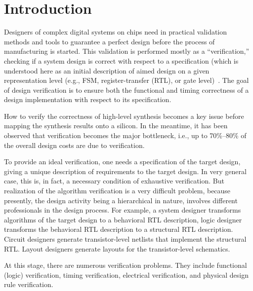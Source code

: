 
      \thispagestyle{headings}

      \begin{multicols}{2}

      \label{st\stat}



\section{Introduction}

\noindent
Designers of complex digital systems on chips need in practical validation methods and tools to guarantee a
perfect design before the process of manufacturing is started. This validation is performed mostly as a
``veri\-fi\-cation,'' checking if a system design is correct with respect to a specification (which is understood here
as an initial description of aimed design on a given representation level (e.g., FSM,
register-transfer (RTL), or gate level)~\cite{1bar}. The goal of design verification is to ensure both the functional and
timing correctness of a design implementation with respect to its specification.

    How to verify the correctness of high-level synthesis becomes a key issue before mapping the synthesis
results onto a silicon. In the meantime, it has been observed that verification becomes the major bottleneck, i.e.,
up to 70\%--80\% of the overall design costs are due to verification.

    To provide an ideal verification, one needs a specification of the target design, giving a unique description of
requirements to the target design. In very general case, this is, in fact, a necessary condition of exhaustive
verification. But realization of the algorithm verification is a
very difficult problem, because presently, the design
activity being a hierarchical in nature, involves different professionals in the design process. For example, a
system designer transforms algorithms of the target design to a behavioral RTL
description, logic designer transforms the behavioral RTL description to a structural RTL description. Circuit
designers generate transistor-\linebreak level netlists that implement the structural RTL.\linebreak 
Layout designers generate layouts for the transistor-level schematics. 

At this stage, there are numerous verification problems.
They include functional (logic) verification, timing
verification, electrical verification, and physical design rule verification.


\end{multicols}
